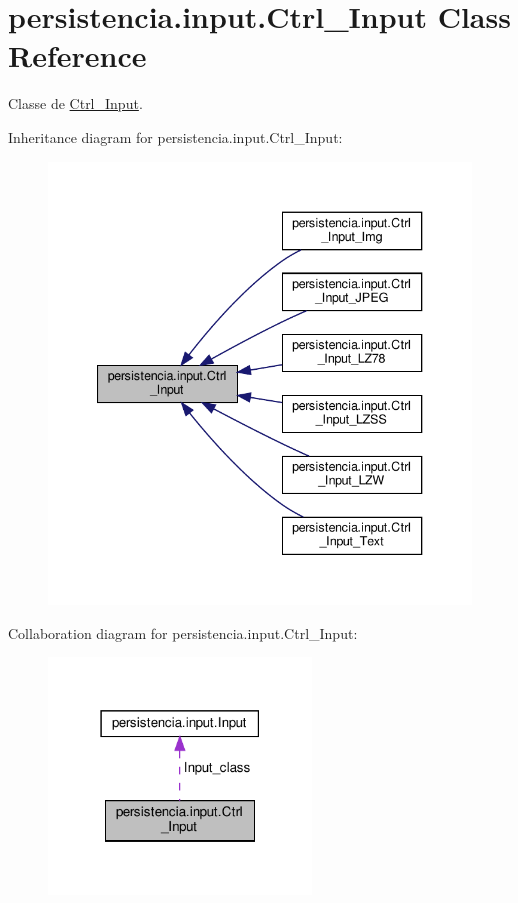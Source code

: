 \hypertarget{classpersistencia_1_1input_1_1Ctrl__Input}{}\section{persistencia.\+input.\+Ctrl\+\_\+\+Input Class Reference}
\label{classpersistencia_1_1input_1_1Ctrl__Input}


Classe de \hyperlink{classpersistencia_1_1input_1_1Ctrl__Input}{Ctrl\+\_\+\+Input}.  




Inheritance diagram for persistencia.\+input.\+Ctrl\+\_\+\+Input\+:
\nopagebreak
\begin{figure}[H]
\begin{center}
\leavevmode
\includegraphics[width=340pt]{classpersistencia_1_1input_1_1Ctrl__Input__inherit__graph}
\end{center}
\end{figure}


Collaboration diagram for persistencia.\+input.\+Ctrl\+\_\+\+Input\+:
\nopagebreak
\begin{figure}[H]
\begin{center}
\leavevmode
\includegraphics[width=198pt]{classpersistencia_1_1input_1_1Ctrl__Input__coll__graph}
\end{center}
\end{figure}
